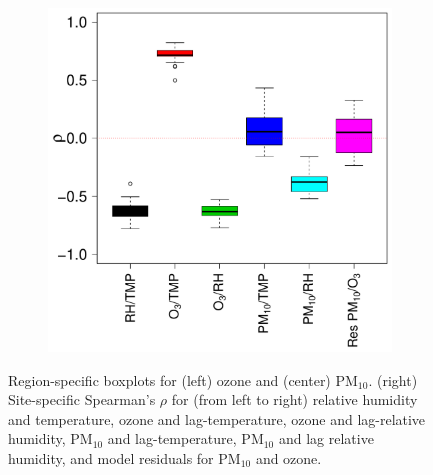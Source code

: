 \documentclass[alpha-refs]{wiley-article}
\begin{document}
\begin{figure}[H]
\begin{center}
\begin{subfigure}[b]{.32\textwidth}
           \label{fig:reg_pm_plots}
   \end{subfigure}
        \begin{subfigure}[b]{.32\textwidth}
     \includegraphics[width=\textwidth]{xy_cor}
           \label{fig:correlation_plots}
   \end{subfigure}
  \end{center}
  \vspace{-4mm}
       \caption{Region-specific boxplots for (left) ozone and (center) $\text{PM}_{10}$. (right) Site-specific Spearman's $\rho$ for (from left to right) relative humidity and temperature, ozone and lag-temperature, ozone and lag-relative humidity, $\text{PM}_{10}$ and lag-temperature, $\text{PM}_{10}$ and lag relative humidity, and model residuals for $\text{PM}_{10}$ and ozone. }\label{fig:reg_box_plot}
\end{figure}

\end{document}
